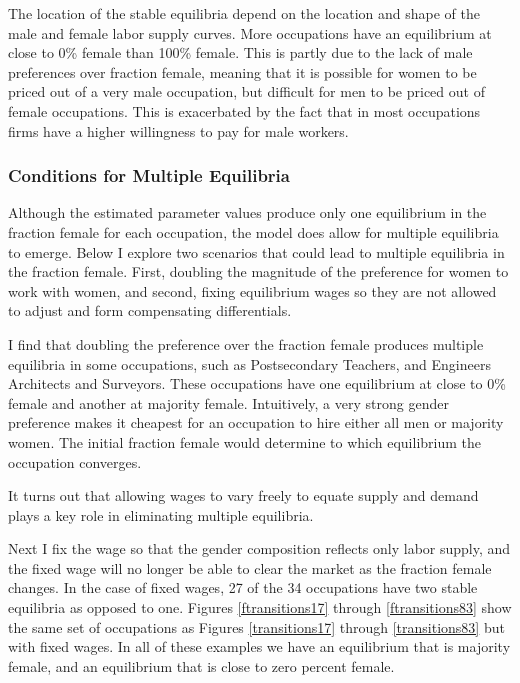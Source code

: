 \documentclass[11pt]{article}
\begin{document}
The location of the stable equilibria depend on the location and shape of the male and female labor supply curves. More occupations have an equilibrium at close to 0\% female than 100\% female. This is partly due to the lack of male preferences over fraction female, meaning that it is possible for women to be priced out of a very male occupation, but difficult for men to be priced out of female occupations. This is exacerbated by the fact that in most occupations firms have a higher willingness to pay for male workers.

\subsubsection{Conditions for Multiple Equilibria}
Although the estimated parameter values produce only one equilibrium in the fraction female for each occupation, the model does allow for multiple equilibria to emerge. Below I explore two scenarios that could lead to multiple equilibria in the fraction female. First, doubling the magnitude of the preference for women to work with women, and second, fixing equilibrium wages so they are not allowed to adjust and form compensating differentials.


I find that doubling the preference over the fraction female produces multiple equilibria in some occupations, such as Postsecondary Teachers, and Engineers Architects and Surveyors. These occupations have one equilibrium at close to 0\% female and another at majority female. Intuitively, a very strong gender preference makes it cheapest for an occupation to hire either all men or majority women. The initial fraction female would determine to which equilibrium the occupation converges. 

It turns out that allowing wages to vary freely to equate supply and demand plays a key role in eliminating multiple equilibria.

Next I fix the wage so that the gender composition reflects only labor supply, and the fixed wage will no longer be able to clear the market as the fraction female changes. In the case of fixed wages, 27 of the 34 occupations have two stable equilibria as opposed to one. Figures \ref{ftransitions17} through \ref{ftransitions83} show the same set of occupations as Figures \ref{transitions17} through \ref{transitions83} but with fixed wages. In all of these examples we have an equilibrium that is majority female, and an equilibrium that is close to zero percent female.
\end{document}
